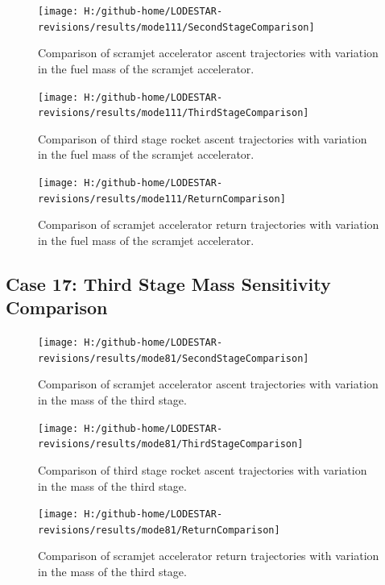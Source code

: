 \begin{figure}[!th]
\centering
\texttt{[image: H:/github-home/LODESTAR-revisions/results/mode111/SecondStageComparison]}
\caption{Comparison of scramjet accelerator ascent trajectories with variation in the fuel mass of the scramjet accelerator.}
\label{fig:SecondStageComparison13}
\end{figure}

\begin{figure}[!th]
\centering
\texttt{[image: H:/github-home/LODESTAR-revisions/results/mode111/ThirdStageComparison]}
\caption{Comparison of third stage rocket ascent trajectories with variation in the fuel mass of the scramjet accelerator.}
\label{fig:ThirdStageComparison13}
\end{figure}

\begin{figure}[!th]
\centering
\texttt{[image: H:/github-home/LODESTAR-revisions/results/mode111/ReturnComparison]}
\caption{Comparison of scramjet accelerator return trajectories with variation in the fuel mass of the scramjet accelerator.}
\label{fig:ReturnComparison13}
\end{figure}


\FloatBarrier
\clearpage
\subsection{Case 17: Third Stage Mass Sensitivity Comparison}\label{sec:app_comparison81}
\begin{figure}[!th]
\centering
\texttt{[image: H:/github-home/LODESTAR-revisions/results/mode81/SecondStageComparison]}
\caption{Comparison of scramjet accelerator ascent trajectories with variation in the mass of the third stage.}
\label{fig:SecondStageComparison14}
\end{figure}

\begin{figure}[!th]
\centering
\texttt{[image: H:/github-home/LODESTAR-revisions/results/mode81/ThirdStageComparison]}
\caption{Comparison of third stage rocket ascent trajectories with variation in the mass of the third stage.}
\label{fig:ThirdStageComparison14}
\end{figure}



\begin{figure}[!th]
	\centering
	\texttt{[image: H:/github-home/LODESTAR-revisions/results/mode81/ReturnComparison]}
	\caption{Comparison of scramjet accelerator return trajectories with variation in the mass of the third stage.}
	\label{fig:ReturnComparison14}
\end{figure}
\FloatBarrier
\clearpage
